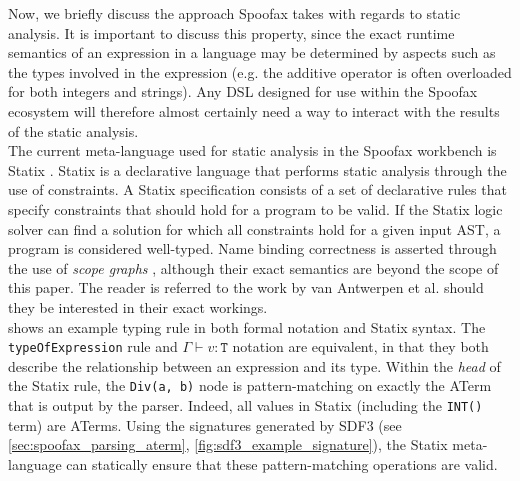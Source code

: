 Now, we briefly discuss the approach Spoofax takes with regards to static analysis. It is important to discuss this property, since the exact runtime semantics of an expression in a language may be determined by aspects such as the types involved in the expression (e.g. the additive operator is often overloaded for both integers and strings). Any \ac{DSL} designed for use within the Spoofax ecosystem will therefore almost certainly need a way to interact with the results of the static analysis.\\

The current meta-language used for static analysis in the Spoofax workbench is Statix \cite{AntwerpenPRV18}. Statix is a declarative language that performs static analysis through the use of constraints. A Statix specification consists of a set of declarative rules that specify constraints that should hold for a program to be valid. If the Statix logic solver can find a solution for which all constraints hold for a given input \ac{AST}, a program is considered well-typed. Name binding correctness is asserted through the use of \textit{scope graphs} \cite{TUD-SERG-2015-009}, although their exact semantics are beyond the scope of this paper. The reader is referred to the work by van Antwerpen et al. \cite{TUD-SERG-2015-009,AntwerpenPRV18,VanAntwerpen2016} should they be interested in their exact workings. \\

 shows an example typing rule in both formal notation and Statix syntax. The \texttt{typeOfExpression} rule and $\Gamma \vdash v : \texttt{T}$ notation are equivalent, in that they both describe the relationship between an expression and its type. Within the \textit{head} of the Statix rule, the \texttt{Div(a, b)} node is pattern-matching on exactly the \ac{ATerm} that is output by the parser. Indeed, all values in Statix (including the \texttt{INT()} term) are \acp{ATerm}. Using the signatures generated by SDF3 (see \cref{sec:spoofax_parsing_aterm}, \cref{fig:sdf3_example_signature}), the Statix meta-language can statically ensure that these pattern-matching operations are valid.\\

